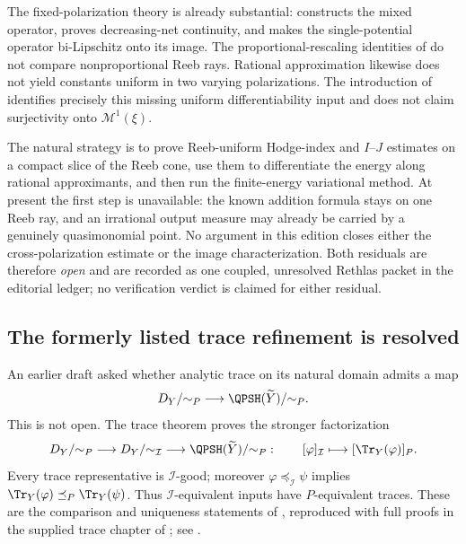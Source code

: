 The fixed-polarization theory is already substantial:
 constructs the mixed operator,
proves decreasing-net continuity, and makes the single-potential operator
bi-Lipschitz onto its image.  The proportional-rescaling identities of
\cite[Proposition~3.3]{Wu24AffineCones} do not compare nonproportional Reeb
rays.  Rational approximation likewise does not yield constants uniform in
two varying polarizations.  The introduction of \cite{Wu24AffineCones}
identifies precisely this missing uniform differentiability input and does
not claim surjectivity onto \(\mathcal M^1(\xi)\).

The natural strategy is to prove Reeb-uniform Hodge-index and
\(I\)--\(J\) estimates on a compact slice of the Reeb cone, use them to
differentiate the energy along rational approximants, and then run the
finite-energy variational method.  At present the first step is unavailable:
the known addition formula stays on one Reeb ray, and an irrational output
measure may already be carried by a genuinely quasimonomial point.  No
argument in this edition closes either the cross-polarization estimate or the
image characterization.  Both residuals are therefore \emph{open} and are
recorded as one coupled, unresolved Rethlas packet in the editorial ledger;
no verification verdict is claimed for either residual.

\subsection{The formerly listed trace refinement is resolved}
\label{sec:frontier-trace-p-resolved}

An earlier draft asked whether analytic trace on its natural domain admits
a map
\[
 D_Y/{\sim_P}\longrightarrow
 \QPSH(\widetilde Y)/{\sim_P}.
\]
This is not open.  The trace theorem proves the stronger factorization
\[
 D_Y/{\sim_P}
 \longrightarrow
 D_Y/{\sim_{\mathcal I}}
 \longrightarrow
 \QPSH(\widetilde Y)/{\sim_P}:
 \qquad
 [\varphi]_{\mathcal I}\longmapsto[\Tr_Y(\varphi)]_P.
\]
Every trace representative is \(\mathcal I\)-good; moreover
\(\varphi\preceq_{\mathcal I}\psi\) implies
\(\Tr_Y(\varphi)\preceq_P\Tr_Y(\psi)\).  Thus
\(\mathcal I\)-equivalent inputs have \(P\)-equivalent traces.  These are
the comparison and uniqueness statements of \cite{DX24}, reproduced with
full proofs in the supplied trace chapter of \cite{XiaBook}; see
.

